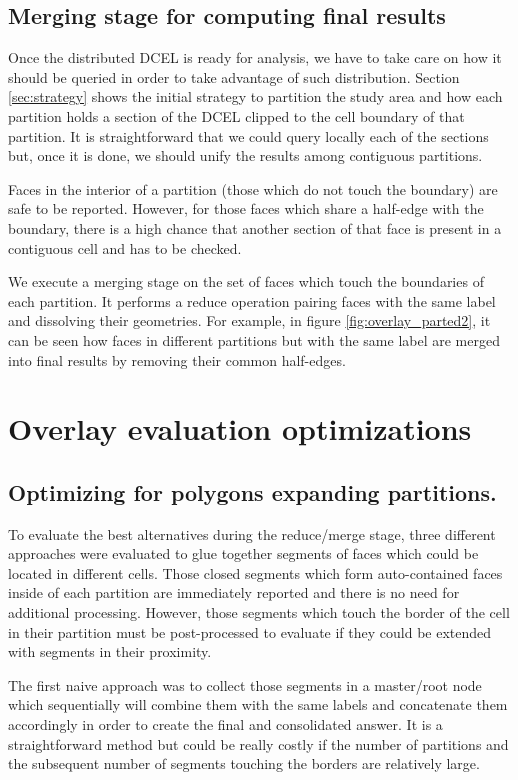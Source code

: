 \subsection{Merging stage for computing final results} \label{sec:merge}
Once the distributed DCEL is ready for analysis, we have to take care on how it should be queried in order to take advantage of such distribution.  Section \ref{sec:strategy} shows the initial strategy to partition the study area and how each partition holds a section of the DCEL clipped to the cell boundary of that partition.  It is straightforward that we could query locally each of the sections but, once it is done, we should unify the results among contiguous partitions.

Faces in the interior of a partition (those which do not touch the boundary) are safe to be reported.  However, for those faces which share a half-edge with the boundary, there is a high chance that another section of that face is present in a contiguous cell and has to be checked.  

We execute a merging stage on the set of faces which touch the boundaries of each partition.  It performs a reduce operation pairing faces with the same label and dissolving their geometries.  For example, in figure \ref{fig:overlay_parted2}, it can be seen how faces in different partitions but with the same label are merged into final results by removing their common half-edges. 

\section{Overlay evaluation optimizations}\label{sec:alternative_methods}
\subsection{Optimizing for polygons expanding partitions.}\label{sec:optimizing}
To evaluate the best alternatives during the reduce/merge stage, three different approaches were evaluated to glue together segments of faces which could be located in different cells.  Those closed segments which form auto-contained faces inside of each partition are immediately reported and there is no need for additional processing.  However, those segments which touch the border of the cell in their partition must be post-processed to evaluate if they could be extended with segments in their proximity.

The first naive approach was to collect those segments in a master/root node which sequentially will combine them with the same labels and concatenate them accordingly in order to create the final and consolidated answer.  It is a straightforward method but could be really costly if the number of partitions and the subsequent number of segments touching the borders are relatively large.

